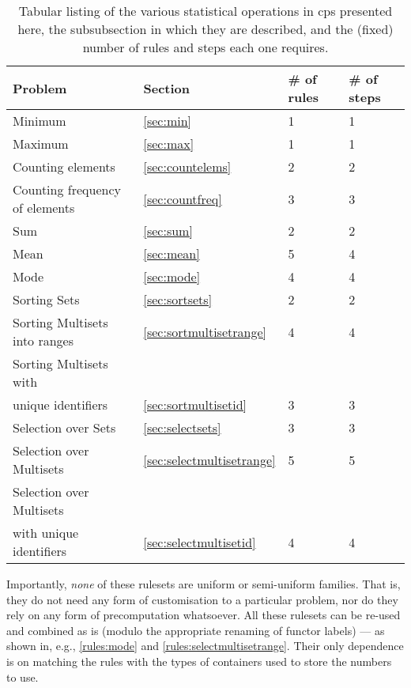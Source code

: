 \begin{table} \centering
   \begin{tabular}{|l|l|l|l|}
    \hline
    \textbf{Problem} & \textbf{Section} & \textbf{\# of rules} & \textbf{\# of steps} \\ \hline
    Minimum & \ref{sec:min} & 1 & 1 \\ %
    Maximum & \ref{sec:max} & 1 & 1 \\ \hline
    Counting elements & \ref{sec:countelems} & 2 & 2 \\ %
    Counting frequency of elements & \ref{sec:countfreq} & 3 & 3 \\ \hline
    Sum & \ref{sec:sum} & 2 & 2 \\ %
    Mean & \ref{sec:mean} & 5 & 4 \\ %
    Mode & \ref{sec:mode} & 4 & 4 \\ \hline
    Sorting Sets & \ref{sec:sortsets} & 2 & 2 \\ %
    Sorting Multisets into ranges & \ref{sec:sortmultisetrange} & 4 & 4 \\ %
    Sorting Multisets with &&&\\ unique identifiers & \ref{sec:sortmultisetid} & 3 & 3 \\ \hline
    Selection over Sets & \ref{sec:selectsets} & 3 & 3 \\ %
    Selection over Multisets & \ref{sec:selectmultisetrange} & 5 & 5 \\ %
    Selection over Multisets &&&\\ with unique identifiers & \ref{sec:selectmultisetid} & 4 & 4 \\ \hline
\end{tabular} 
\caption[Listing of various statistical operations in \gls{cps}]{\label{tab:summary}Tabular listing of the various statistical operations in \gls{cps} presented here, the subsubsection in which they are described, and the (fixed) number of rules and steps each one requires.}
\end{table}

Importantly, \emph{none} of these rulesets are uniform or semi-uniform families.  That is, they do not need any form of customisation to a particular problem, nor do they rely on any form of precomputation whatsoever.  All these rulesets can be re-used and combined as is (modulo the appropriate renaming of functor labels) --- as shown in, e.g., \cref{rules:mode} and \cref{rules:selectmultisetrange}.  Their only dependence is on matching the rules with the types of containers used to store the numbers to use.

